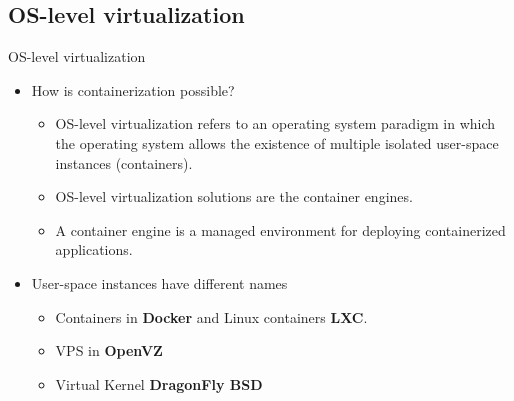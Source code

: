 \subsection{OS-level virtualization}\label{subsec:os-level-virtualization}
\begin{frame}{OS-level virtualization}
    \begin{itemize}[<+- | alert@+>]
        \item How is containerization possible?
        \begin{itemize}
            \item OS-level virtualization refers to an operating system paradigm in which the operating system allows the existence of multiple isolated user-space instances (containers).
            \item OS-level virtualization solutions are the container engines.
            \item A container engine is a managed environment for deploying containerized applications.
        \end{itemize}
        \item User-space instances have different names
        \begin{itemize}
            \item Containers in \textbf{Docker} and Linux containers \textbf{LXC}.
            \item VPS in \textbf{OpenVZ}
            \item Virtual Kernel \textbf{DragonFly BSD}
        \end{itemize}
    \end{itemize}
\end{frame}
